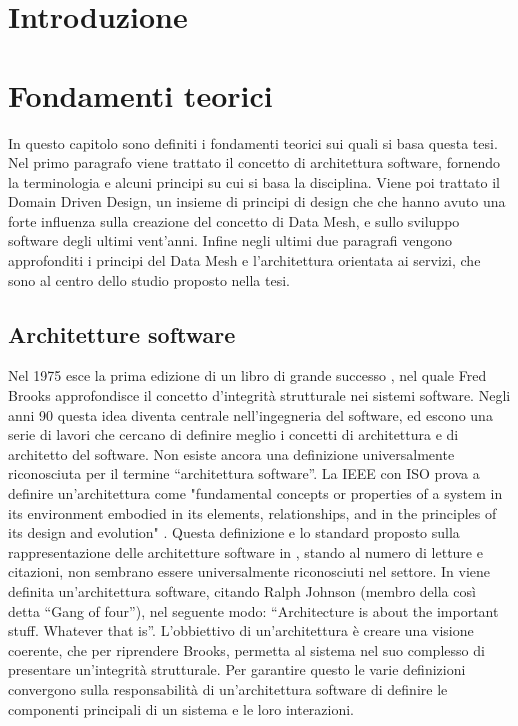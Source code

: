 \documentclass[12pt]{report}
\begin{document}
\chapter*{Introduzione}
\chapter{Fondamenti teorici}
In questo capitolo sono definiti i fondamenti teorici sui quali si basa questa tesi.
Nel primo paragrafo viene trattato il concetto di architettura software, fornendo la terminologia e alcuni principi su cui si basa la disciplina.
Viene poi trattato il Domain Driven Design, un insieme di principi di design che che hanno avuto una forte influenza sulla creazione del concetto di Data Mesh, e sullo sviluppo software degli ultimi vent'anni.
Infine negli ultimi due paragrafi vengono approfonditi i principi del Data Mesh e l'architettura orientata ai servizi, che sono al centro dello studio proposto nella tesi.

\section{Architetture software}
Nel 1975 esce la prima edizione di un libro di grande successo \cite{brooks_jr_mythical_1974}, nel quale Fred Brooks approfondisce il concetto d'integrità strutturale nei sistemi software.
Negli anni 90 questa idea diventa centrale nell'ingegneria del software, ed escono una serie di lavori che  cercano di definire meglio i concetti di architettura e di architetto del software. 
Non esiste ancora una definizione universalmente riconosciuta per il termine ``architettura software''.
La IEEE con ISO prova a definire un'architettura come "fundamental concepts or properties of a system in its environment embodied in its elements, relationships, and in the principles of its design and evolution" \cite{isoiecieee_2011}.
Questa definizione e lo standard proposto sulla rappresentazione delle architetture software in \cite{isoiecieee_2011}, stando al numero di letture e citazioni, non sembrano essere universalmente riconosciuti nel settore.
In \cite{whoneedsanArchitect} viene definita un'architettura software, citando Ralph Johnson (membro della così detta ``Gang of four''), nel seguente modo: ``Architecture is about the important stuff. Whatever that is''. 
L'obbiettivo di un'architettura è creare una visione coerente, che per riprendere Brooks, permetta al sistema nel suo complesso di presentare un'integrità strutturale. 
Per garantire questo le varie definizioni convergono sulla responsabilità di un'architettura software di definire le componenti principali di un sistema e le loro interazioni.
\end{document}
